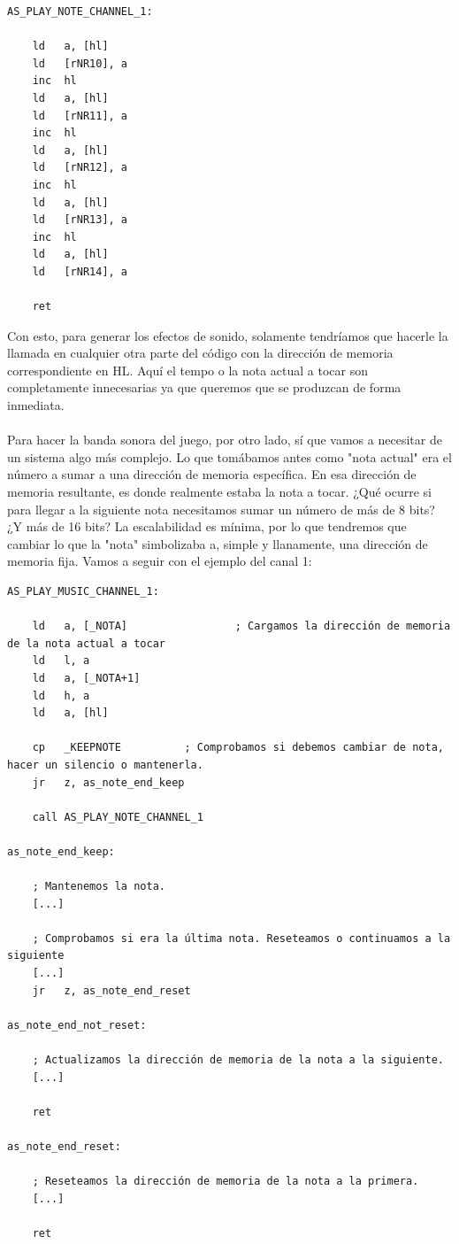 \begin{lstlisting}[caption={Método de Sonido en Canal 1}, label={code:channel1sound}]
AS_PLAY_NOTE_CHANNEL_1:

    ld   a, [hl]
    ld   [rNR10], a
    inc  hl
    ld   a, [hl]
    ld   [rNR11], a
    inc  hl
    ld   a, [hl]
    ld   [rNR12], a
    inc  hl
    ld   a, [hl]
    ld   [rNR13], a              
    inc  hl
    ld   a, [hl]
    ld   [rNR14], a

    ret
\end{lstlisting}

Con esto, para generar los efectos de sonido, solamente tendríamos que hacerle la llamada en cualquier otra parte del código con la dirección de memoria correspondiente en HL. Aquí el tempo o la nota actual a tocar son completamente innecesarias ya que queremos que se produzcan de forma inmediata.
\\ \\
Para hacer la banda sonora del juego, por otro lado, sí que vamos a necesitar de un sistema algo más complejo. Lo que tomábamos antes como "nota actual" era el número a sumar a una dirección de memoria específica. En esa dirección de memoria resultante, es donde realmente estaba la nota a tocar. ¿Qué ocurre si para llegar a la siguiente nota necesitamos sumar un número de más de 8 bits? ¿Y más de 16 bits? La escalabilidad es mínima, por lo que tendremos que cambiar lo que la "nota" simbolizaba a, simple y llanamente, una dirección de memoria fija. Vamos a seguir con el ejemplo del canal 1: 

\begin{lstlisting}[caption={Método de Música en Canal 1}, label={code:channel1music}]
AS_PLAY_MUSIC_CHANNEL_1:

    ld   a, [_NOTA]               	; Cargamos la dirección de memoria de la nota actual a tocar
    ld   l, a                    
    ld   a, [_NOTA+1]
    ld   h, a
    ld   a, [hl]                 

    cp   _KEEPNOTE 			; Comprobamos si debemos cambiar de nota, hacer un silencio o mantenerla.
    jr   z, as_note_end_keep

    call AS_PLAY_NOTE_CHANNEL_1

as_note_end_keep:

	; Mantenemos la nota.
    [...]
    
    ; Comprobamos si era la última nota. Reseteamos o continuamos a la siguiente
    [...]
	jr 	 z, as_note_end_reset
	
as_note_end_not_reset:

    ; Actualizamos la dirección de memoria de la nota a la siguiente.
    [...]
	
	ret
	
as_note_end_reset:

    ; Reseteamos la dirección de memoria de la nota a la primera.
    [...]

    ret
\end{lstlisting}

